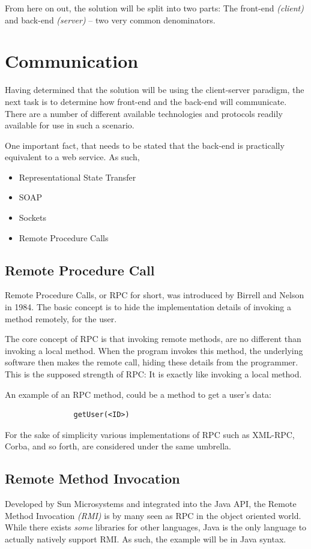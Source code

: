 			From here on out, the solution will be split into two parts: The front-end \emph{(client)} and back-end \emph{(server)} -- two very common denominators.

	\section{Communication}
		\label{sec:comms}
		Having determined that the solution will be using the client-server paradigm, the next task is to determine how front-end and the back-end will communicate. There are a number of different available technologies and protocols readily available for use in such a scenario.

		One important fact, that needs to be stated that the back-end is practically equivalent to a web service. As such, 

		\begin{itemize}
			\item Representational State Transfer
			\item SOAP	
			\item Sockets
			\item Remote Procedure Calls
		\end{itemize}

		\subsection{Remote Procedure Call}
			Remote Procedure Calls, or RPC for short, was introduced by Birrell and Nelson \cite{birell1984} in 1984. The basic concept is to hide the implementation details of invoking a method remotely, for the user.

			The core concept of RPC is that invoking remote methods, are no different than invoking a local method. When the program invokes this method, the underlying software then makes the remote call, hiding these details from the programmer. This is the supposed strength of RPC: It is exactly like invoking a local method.

			An example of an RPC method, could be a method to get a user's data:
			\begin{verbatim}
				getUser(<ID>)
			\end{verbatim}

			For the sake of simplicity various implementations of RPC such as XML-RPC, Corba, and so forth, are considered under the same umbrella.
		
		\subsection{Remote Method Invocation}
			Developed by Sun Microsystems and integrated into the Java API\cite{Downing:1998:JRR:522413}, the Remote Method Invocation \emph{(RMI)} is by many seen as RPC in the object oriented world. While there exists \emph{some} libraries for other languages, Java is the only language to actually natively support RMI. As such, the example will be in Java syntax.

